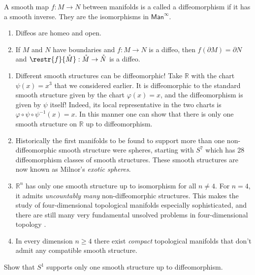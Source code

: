 \documentclass[english,letterpaper]{article}%
\numberwithin{equation}{section}
\numberwithin{figure}{section}
\numberwithin{table}{section}
\theoremstyle{definition}
\theoremstyle{definition}
\theoremstyle{definition}
\theoremstyle{plain}
\theoremstyle{plain}
\theoremstyle{plain}
\theoremstyle{plain}
\theoremstyle{remark}
\theoremstyle{remark}
\newcommand{\bbR}{\mathbb{R}}
\renewcommand{\geq}{\geqslant}
\begin{document}
\begin{defn}[Diffeomorphisms]
A smooth map $f:M\to N$ between manifolds is a called a diffeomorphism if it has a smooth inverse. They are the isomorphisms in $\mathsf{Man}^\infty$.
\end{defn}
\begin{prop}
\begin{enumerate}
    \item Diffeos are homeo and open.
    \item If $M$ and $N$ have boundaries and $f:M\to N$ is a diffeo, then $f(\partial M)=\partial N$ and $\restr{f}{\mathring M}: \mathring M\to \mathring N$ is a diffeo.
\end{enumerate}
\end{prop}
\begin{example}
\begin{enumerate}
    \item Different smooth structures can be diffeomorphic! Take $\mathbb{R}$ with the chart $\psi(x)=x^3$ that we considered earlier. It is diffeomorphic to the standard smooth structure given by the chart $\varphi(x)=x$, and the diffeomorphism is given by $\psi$ itself! Indeed, its local representative in the two charts is $\varphi\circ \psi \circ\psi^{-1}(x)=x$. In this manner one can show that there is only one smooth structure on $\bbR$ up to diffeomorphism.
    \item Historically the first manifolds to be found to support more than one non-diffeomorphic smooth structure were spheres, starting with $S^7$ which has 28 diffeomorphism classes of smooth structures. These smooth structures are now known as Milnor's \emph{exotic spheres}.
    \item $\mathbb{R}^n$ has only one smooth structure up to isomorphism for all $n\neq 4$. For $n=4$, it admits \emph{uncountably many} non-diffeomorphic structures. This makes the study of four-dimensional topological manifolds especially sophisticated, and there are still many very fundamental unsolved problems in four-dimensional topology \cite{smooth.structures}.
    \item In every dimension $n\geq 4$ there exist \emph{compact} topological manifolds that don't admit any compatible smooth structure.
\end{enumerate}
\end{example}

\begin{xca}
    Show that $S^1$ supports only one smooth structure up to diffeomorphism.
\end{xca}
\end{document}
